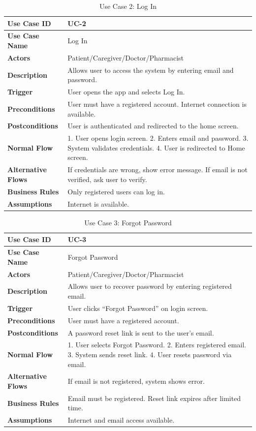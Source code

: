 \begin{table}[H]
\centering
\caption{Use Case 2: Log In}
\begin{tabularx}{\textwidth}{|l|X|}
\hline
\textbf{Use Case ID} & UC-2 \\ \hline
\textbf{Use Case Name} & Log In \\ \hline
\textbf{Actors} & Patient/Caregiver/Doctor/Pharmacist \\ \hline
\textbf{Description} & Allows user to access the system by entering email and password. \\ \hline
\textbf{Trigger} & User opens the app and selects Log In. \\ \hline
\textbf{Preconditions} & User must have a registered account. Internet connection is available. \\ \hline
\textbf{Postconditions} & User is authenticated and redirected to the home screen. \\ \hline
\textbf{Normal Flow} & 1. User opens login screen. 2. Enters email and password. 3. System validates credentials. 4. User is redirected to Home screen. \\ \hline
\textbf{Alternative Flows} & If credentials are wrong, show error message. If email is not verified, ask user to verify. \\ \hline
\textbf{Business Rules} & Only registered users can log in. \\ \hline
\textbf{Assumptions} & Internet is available. \\ \hline
\end{tabularx}
\end{table}

\begin{table}[H]
\centering
\caption{Use Case 3: Forgot Password}
\begin{tabularx}{\textwidth}{|l|X|}
\hline
\textbf{Use Case ID} & UC-3 \\ \hline
\textbf{Use Case Name} & Forgot Password \\ \hline
\textbf{Actors} & Patient/Caregiver/Doctor/Pharmacist \\ \hline
\textbf{Description} & Allows user to recover password by entering registered email. \\ \hline
\textbf{Trigger} & User clicks ``Forgot Password'' on login screen. \\ \hline
\textbf{Preconditions} & User must have a registered account. \\ \hline
\textbf{Postconditions} & A password reset link is sent to the user's email. \\ \hline
\textbf{Normal Flow} & 1. User selects Forgot Password. 2. Enters registered email. 3. System sends reset link. 4. User resets password via email. \\ \hline
\textbf{Alternative Flows} & If email is not registered, system shows error. \\ \hline
\textbf{Business Rules} & Email must be registered. Reset link expires after limited time. \\ \hline
\textbf{Assumptions} & Internet and email access available. \\ \hline
\end{tabularx}
\end{table}

